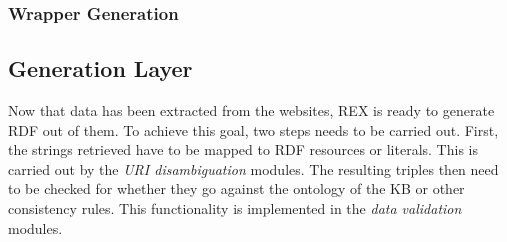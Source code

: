 

\subsubsection{Wrapper Generation} %
\label{alfred}



\subsection{Generation Layer}
Now that data has been extracted from the websites, REX is ready to generate \ac{RDF} out of them. 
To achieve this goal, two steps needs to be carried out. 
First, the strings retrieved have to be mapped to \ac{RDF} resources or literals. 
This is carried out by the \emph{URI disambiguation} modules. 
The resulting triples then need to be checked for whether they go against the ontology of the  \ac{KB} or other consistency rules. 
This functionality is implemented in the \emph{data validation} modules. 

